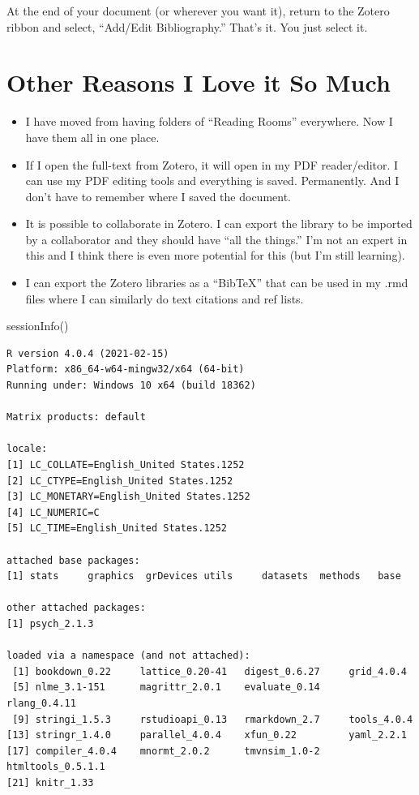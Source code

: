 \documentclass[
  english,
]{book}
\newenvironment{Shaded}{\begin{snugshade}}{\end{snugshade}}
\newcommand{\FunctionTok}[1]{\textcolor[rgb]{0.00,0.00,0.00}{#1}}
\newcommand{\NormalTok}[1]{#1}
\providecommand{\tightlist}{%
  \setlength{\itemsep}{0pt}\setlength{\parskip}{0pt}}
\begin{document}
At the end of your document (or wherever you want it), return to the Zotero ribbon and select, ``Add/Edit Bibliography.'' That's it. You just select it.

\hypertarget{other-reasons-i-love-it-so-much}{%
\section{Other Reasons I Love it So Much}\label{other-reasons-i-love-it-so-much}}

\begin{itemize}
\tightlist
\item
  I have moved from having folders of ``Reading Rooms'' everywhere. Now I have them all in one place.
\item
  If I open the full-text from Zotero, it will open in my PDF reader/editor. I can use my PDF editing tools and everything is saved. Permanently. And I don't have to remember where I saved the document.
\item
  It is possible to collaborate in Zotero. I can export the library to be imported by a collaborator and they should have ``all the things.'' I'm not an expert in this and I think there is even more potential for this (but I'm still learning).
\item
  I can export the Zotero libraries as a ``BibTeX'' that can be used in my .rmd files where I can similarly do text citations and ref lists.
\end{itemize}

\begin{Shaded}
\begin{Highlighting}[]
\FunctionTok{sessionInfo}\NormalTok{()}
\end{Highlighting}
\end{Shaded}

\begin{verbatim}
R version 4.0.4 (2021-02-15)
Platform: x86_64-w64-mingw32/x64 (64-bit)
Running under: Windows 10 x64 (build 18362)

Matrix products: default

locale:
[1] LC_COLLATE=English_United States.1252 
[2] LC_CTYPE=English_United States.1252   
[3] LC_MONETARY=English_United States.1252
[4] LC_NUMERIC=C                          
[5] LC_TIME=English_United States.1252    

attached base packages:
[1] stats     graphics  grDevices utils     datasets  methods   base     

other attached packages:
[1] psych_2.1.3

loaded via a namespace (and not attached):
 [1] bookdown_0.22     lattice_0.20-41   digest_0.6.27     grid_4.0.4       
 [5] nlme_3.1-151      magrittr_2.0.1    evaluate_0.14     rlang_0.4.11     
 [9] stringi_1.5.3     rstudioapi_0.13   rmarkdown_2.7     tools_4.0.4      
[13] stringr_1.4.0     parallel_4.0.4    xfun_0.22         yaml_2.2.1       
[17] compiler_4.0.4    mnormt_2.0.2      tmvnsim_1.0-2     htmltools_0.5.1.1
[21] knitr_1.33       
\end{verbatim}
\end{document}
